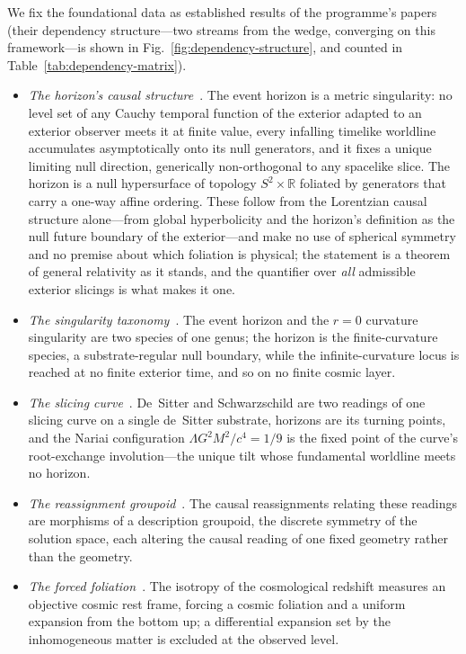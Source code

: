 \documentclass[11pt,a4paper]{article}
\theoremstyle{plain}
\theoremstyle{definition}
\theoremstyle{remark}
\begin{document}
We fix the foundational data as established results of the programme's papers (their dependency structure---two streams from the wedge, converging on this framework---is shown in Fig.~\ref{fig:dependency-structure}, and counted in Table~\ref{tab:dependency-matrix}).
\begin{itemize}
\item[(F1)] \emph{The horizon's causal structure}~\cite{JanzenBHcausality}. The event horizon is a metric singularity: no level set of any Cauchy temporal function of the exterior adapted to an exterior observer meets it at finite value, every infalling timelike worldline accumulates asymptotically onto its null generators, and it fixes a unique limiting null direction, generically non-orthogonal to any spacelike slice. The horizon is a null hypersurface of topology $S^2\times\mathbb{R}$ foliated by generators that carry a one-way affine ordering. These follow from the Lorentzian causal structure alone---from global hyperbolicity and the horizon's definition as the null future boundary of the exterior---and make no use of spherical symmetry and no premise about which foliation is physical; the statement is a theorem of general relativity as it stands, and the quantifier over \emph{all} admissible exterior slicings is what makes it one.
\item[(F2)] \emph{The singularity taxonomy}~\cite{JanzenCircle,JanzenBHcausality}. The event horizon and the $r=0$ curvature singularity are two species of one genus; the horizon is the finite-curvature species, a substrate-regular null boundary, while the infinite-curvature locus is reached at no finite exterior time, and so on no finite cosmic layer.
\item[(F3)] \emph{The slicing curve}~\cite{JanzenSlicing}. De~Sitter and Schwarzschild are two readings of one slicing curve on a single de~Sitter substrate, horizons are its turning points, and the Nariai configuration $\Lambda G^2M^2/c^4=1/9$ is the fixed point of the curve's root-exchange involution---the unique tilt whose fundamental worldline meets no horizon.
\item[(F4)] \emph{The reassignment groupoid}~\cite{JanzenGroupoid}. The causal reassignments relating these readings are morphisms of a description groupoid, the discrete symmetry of the solution space, each altering the causal reading of one fixed geometry rather than the geometry.
\item[(F5)] \emph{The forced foliation}~\cite{JanzenModernParallax}. The isotropy of the cosmological redshift measures an objective cosmic rest frame, forcing a cosmic foliation and a uniform expansion from the bottom up; a differential expansion set by the inhomogeneous matter is excluded at the observed level.

\end{itemize}
\end{document}
